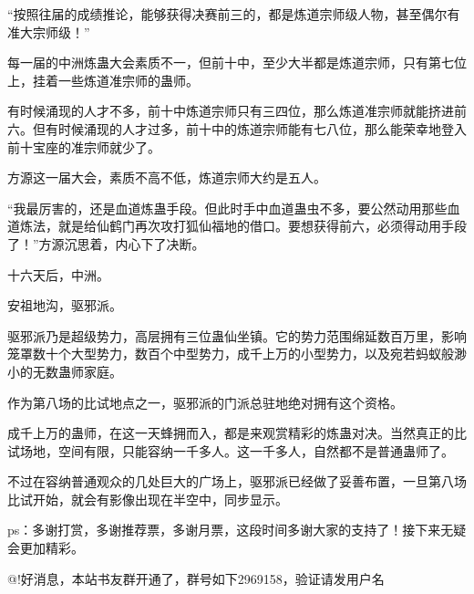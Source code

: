 \begin{this_body}
“按照往届的成绩推论，能够获得决赛前三的，都是炼道宗师级人物，甚至偶尔有准大宗师级！”

每一届的中洲炼蛊大会素质不一，但前十中，至少大半都是炼道宗师，只有第七位上，挂着一些炼道准宗师的蛊师。

有时候涌现的人才不多，前十中炼道宗师只有三四位，那么炼道准宗师就能挤进前六。但有时候涌现的人才过多，前十中的炼道宗师能有七八位，那么能荣幸地登入前十宝座的准宗师就少了。

方源这一届大会，素质不高不低，炼道宗师大约是五人。

“我最厉害的，还是血道炼蛊手段。但此时手中血道蛊虫不多，要公然动用那些血道炼法，就是给仙鹤门再次攻打狐仙福地的借口。要想获得前六，必须得动用手段了！”方源沉思着，内心下了决断。

十六天后，中洲。

安祖地沟，驱邪派。

驱邪派乃是超级势力，高层拥有三位蛊仙坐镇。它的势力范围绵延数百万里，影响笼罩数十个大型势力，数百个中型势力，成千上万的小型势力，以及宛若蚂蚁般渺小的无数蛊师家庭。

作为第八场的比试地点之一，驱邪派的门派总驻地绝对拥有这个资格。

成千上万的蛊师，在这一天蜂拥而入，都是来观赏精彩的炼蛊对决。当然真正的比试场地，空间有限，只能容纳一千多人。这一千多人，自然都不是普通蛊师了。

不过在容纳普通观众的几处巨大的广场上，驱邪派已经做了妥善布置，一旦第八场比试开始，就会有影像出现在半空中，同步显示。

ps：多谢打赏，多谢推荐票，多谢月票，这段时间多谢大家的支持了！接下来无疑会更加精彩。

@!好消息，本站书友群开通了，群号如下2969158，验证请发用户名

\end{this_body}

